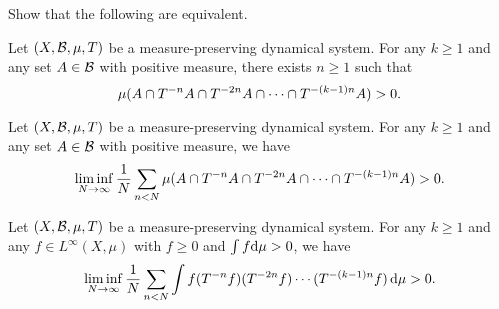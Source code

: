 \documentclass[reqno, twoside]{article}
\begin{document}
    \begin{exercise}
        Show that the following are equivalent.
        \begin{center}
            \begin{minipage}{0.95\textwidth}
                \begin{theorem*}
                    Let $(X,\mathcal{B},\mu,T)$ be a measure-preserving dynamical system. For any $k\geq1$ and any set $A\in\mathcal{B}$ with positive measure, there exists $n\geq1$ such that
                    \vspace{-0.05in}
                    \begin{equation*}
                        \mu(A\cap T^{-n}A\cap T^{-2n}A\cap\cdots\cap T^{-(k-1)n}A)>0.
                        \vspace{-0.05in}
                    \end{equation*}
                \end{theorem*}
                \begin{theorem*}
                    Let $(X,\mathcal{B},\mu,T)$ be a measure-preserving dynamical system. For any $k\geq1$ and any set $A\in\mathcal{B}$ with positive measure, we have
                    \vspace{-0.05in}
                    \begin{equation*}
                        \liminf_{N\to\infty}\frac{1}{N}\sum_{n<N}\mu(A\cap T^{-n}A\cap T^{-2n}A\cap\cdots\cap T^{-(k-1)n}A)>0.
                        \vspace{-0.05in}
                    \end{equation*}
                \end{theorem*}
                \begin{theorem*}
                    Let $(X,\mathcal{B},\mu,T)$ be a measure-preserving dynamical system. For any $k\geq1$ and any $f\in L^\infty(X,\mu)$ with $f\geq0$ and $\int f\mathrm{d}\mu>0$, we have
                    \vspace{-0.05in}
                    \begin{equation*}
                        \liminf_{N\to\infty}\frac{1}{N}\sum_{n<N}\int f(T^{-n}f)(T^{-2n}f)\cdots(T^{-(k-1)n}f)\,\d\mu>0.
                        \vspace{-0.05in}
                    \end{equation*}
                \end{theorem*}
                \begin{theorem*}

\end{theorem*}
\end{minipage}
\end{center}
\end{exercise}
\end{document}
